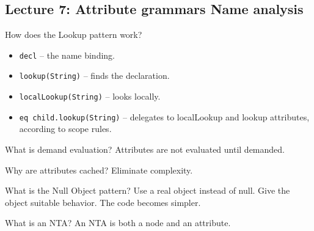 \documentclass[11pt]{beamer}
\begin{document}
\subsection{Lecture 7: Attribute grammars Name analysis}
\begin{frame}


\begin{block}{How does the Lookup pattern work?}
\begin{itemize}
\item \texttt{decl} – the name binding.
\item \texttt{lookup(String)} – finds the declaration.
\item \texttt{localLookup(String)} – looks locally.
\item \texttt{eq child.lookup(String)} – delegates to localLookup and lookup attributes, according to scope rules.
\end{itemize}
\end{block}


\begin{block}{What is demand evaluation? }
Attributes are not evaluated until demanded.
\end{block}


\begin{block}{Why are attributes cached? }
Eliminate complexity.
\end{block}

\begin{block}{What is the Null Object pattern?}
Use a real object instead of null. Give the object suitable behavior. The code becomes simpler.
\end{block}


\end{frame}

\begin{frame}
\begin{block}{What is an NTA? }
An NTA is both a node and an attribute.
\end{block}
\end{frame}
\end{document}
